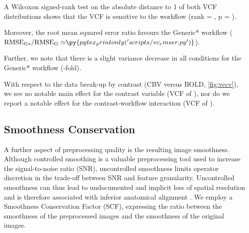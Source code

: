 A Wilcoxon signed-rank test on the absolute distance to 1 of both VCF distributions shows that the VCF is sensitive to the workflow (rank = , p = ).

%
Moreover, the root mean squared error ratio favours the Generic* workflow
($\mathrm{RMSE_{G*}/RMSE_{G}\simeq} \py{pytex_printonly('scripts/vc_rmser.py')}$).

Further, we note that there is a slight variance decrease in all conditions for the Generic* workflow
(-fold).

With respect to the data break-up by contrast (CBV versus BOLD, \cref{fig:vccv}), we see no notable main effect for the contrast variable
(VCF of ), nor do we report a notable effect for the contrast-workflow interaction (VCF of ).

\subsection{Smoothness Conservation}

A further aspect of preprocessing quality is the resulting image smoothness.
Although controlled smoothing is a valuable preprocessing tool used to increase the signal-to-noise ratio (SNR), uncontrolled smoothness limits operator discretion in the trade-off between SNR and feature granularity.
Uncontrolled smoothness can thus lead to undocumented and implicit loss of spatial resolution and is therefore associated with inferior anatomical alignment \cite{fmriprep}.
We employ a Smoothness Conservation Factor (SCF), expressing the ratio between the smoothness of the preprocessed images and the smoothness of the original images.

